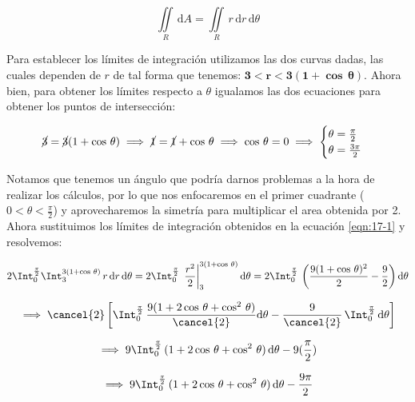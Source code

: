 \documentclass[12pt]{article}
\begin{document}
\begin{equation}\label{eqn:17-1}\tag{1}
	\iint\limits_R\, \mathrm{d}A = \iint\limits_R\, r\,\mathrm{d}r\,\mathrm{d}\theta
\end{equation}

\noindent Para establecer los límites de integración utilizamos las dos curvas dadas, las cuales dependen de $r$ de tal forma que tenemos: $\boldsymbol{3<r<3(1+\cos\,\theta)}$. Ahora bien, para obtener los límites respecto a $\theta$ igualamos las dos ecuaciones para obtener los puntos de intersección:

\begin{align*}
	\cancel{3} = \cancel{3}(1 + \cos\,\theta) \implies \cancel{1} = \cancel{1} + \cos\,\theta \implies \cos\,\theta = 0 \implies \begin{cases}
		\theta = \frac{\pi}{2} \\
		\theta = \frac{3\pi}{2}
	\end{cases}
\end{align*}

\noindent Notamos que tenemos un ángulo que podría darnos problemas a la hora de realizar los cálculos, por lo que nos enfocaremos en el primer cuadrante ($0<\theta<\frac{\pi}{2}$) y aprovecharemos la simetría para multiplicar el area obtenida por 2. Ahora sustituimos los límites de integración obtenidos en la ecuación \eqref{eqn:17-1} y resolvemos:

\begin{align*}
	2\Int_{0}^{\frac{\pi}{2}} \Int_{3}^{3(1+\cos\,\theta)}\, r\,\mathrm{d}r\,\mathrm{d}\theta = 2\Int_{0}^{\frac{\pi}{2}}\, \left.\frac{r^2}{2}\right|_{3}^{3(1+\cos\,\theta)} \mathrm{d}\theta = 2\Int_{0}^{\frac{\pi}{2}}\, \left(\frac{9(1+\cos\,\theta)^2}{2}  - \frac{9}{2}\right)  \mathrm{d}\theta
\end{align*}

\begin{align*}
	\implies \cancel{2}\left[ \Int_{0}^{\frac{\pi}{2}}\, \frac{9(1+2\cos\,\theta+\cos^2\,\theta)}{\cancel{2}} \mathrm{d}\theta  - \frac{9}{\cancel{2}}\, \Int_{0}^{\frac{\pi}{2}}\, \mathrm{d}\theta \right]
\end{align*}

\begin{align*}
	\implies 9\Int_{0}^{\frac{\pi}{2}}\, (1+2\cos\,\theta+\cos^2\,\theta)\, \mathrm{d}\theta  - 9 (\frac{\pi}{2})
\end{align*}

\begin{align*}
	\implies 9\Int_{0}^{\frac{\pi}{2}}\, (1+2\cos\,\theta+\cos^2\,\theta)\, \mathrm{d}\theta  - \frac{9\pi}{2}
\end{align*}
\end{document}
